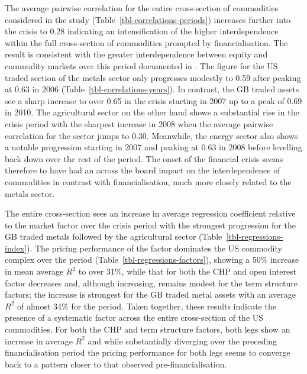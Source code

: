 \documentclass[
  authoryear,
  preprint,
  3p]{elsarticle}
\begin{document}
The average pairwise correlation for the entire cross-section of
commodities considered in the study
(Table~\ref{tbl-correlations-periods}) increases further into the crisis
to 0.28 indicating an intensification of the higher interdependence
within the full cross-section of commodities prompted by
financialisation. The result is consistent with the greater
interdependence between equity and commodity markets over this period
documented in \citet{silvennoinen_financialisation_2013}. The figure for
the US traded section of the metals sector only progresses modestly to
0.59 after peaking at 0.63 in 2006 (Table~\ref{tbl-correlations-years}).
In contrast, the GB traded assets see a sharp increase to over 0.65 in
the crisis starting in 2007 up to a peak of 0.69 in 2010. The
agricultural sector on the other hand shows a substantial rise in the
crisis period with the sharpest increase in 2008 when the average
pairwise correlation for the sector jumps to 0.30. Meanwhile, the energy
sector also shows a notable progression starting in 2007 and peaking at
0.63 in 2008 before levelling back down over the rest of the period. The
onset of the financial crisis seems therefore to have had an across the
board impact on the interdependence of commodities in contrast with
financialisation, much more closely related to the metals sector.

\medskip

The entire cross-section sees an increase in average regression
coefficient relative to the market factor over the crisis period with
the strongest progression for the GB traded metals followed by the
agricultural sector (Table~\ref{tbl-regressions-index}). The pricing
performance of the factor dominates the US commodity complex over the
period (Table~\ref{tbl-regressions-factors}), showing a 50\% increase in
mean average \(R^{2}\) to over 31\%, while that for both the CHP and
open interest factor decreases and, although increasing, remains modest
for the term structure factors; the increase is strongest for the GB
traded metal assets with an average \(R^{2}\) of almost 34\% for the
period. Taken together, these results indicate the presence of a
systematic factor across the entire cross-section of the US commodities.
For both the CHP and term structure factors, both legs show an increase
in average \(R^{2}\) and while substantially diverging over the
preceding financialisation period the pricing performance for both legs
seems to converge back to a pattern closer to that observed
pre-financialisation.

\bigskip
\bigskip
\end{document}
